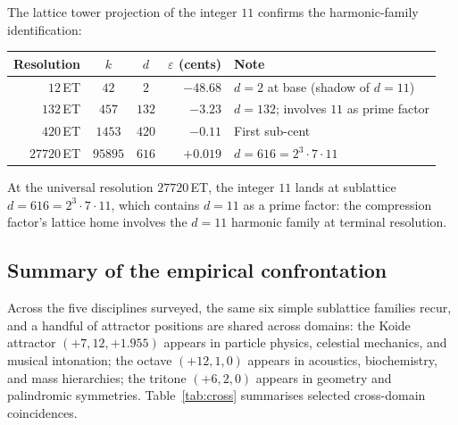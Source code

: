 \documentclass[11pt,a4paper]{article}
\theoremstyle{definition}
\theoremstyle{remark}
\begin{document}
The lattice tower projection of the integer $11$ confirms the harmonic-family identification:
\begin{center}
\begin{tabular}{@{}r c c r l@{}}
\toprule
Resolution & $k$ & $d$ & $\varepsilon$ (cents) & Note\\
\midrule
$12$\,ET & $42$ & $2$ & $-48.68$ & $d=2$ at base (shadow of $d=11$)\\
$132$\,ET & $457$ & $132$ & $-3.23$ & $d=132$; involves $11$ as prime factor\\
$420$\,ET & $1453$ & $420$ & $-0.11$ & First sub-cent\\
$27720$\,ET & $95895$ & $616$ & $+0.019$ & $d = 616 = 2^{3}\!\cdot\!7\!\cdot\!11$\\
\bottomrule
\end{tabular}
\end{center}
At the universal resolution $27720$\,ET, the integer $11$ lands at sublattice $d = 616 = 2^{3}\cdot 7\cdot 11$, which contains $d=11$ as a prime factor: the compression factor's lattice home involves the $d=11$ harmonic family at terminal resolution.

\subsection{Summary of the empirical confrontation}

Across the five disciplines surveyed, the same six simple sublattice families recur, and a handful of attractor positions are shared across domains: the Koide attractor $(+7,12,+1.955)$ appears in particle physics, celestial mechanics, and musical intonation; the octave $(+12,1,0)$ appears in acoustics, biochemistry, and mass hierarchies; the tritone $(+6,2,0)$ appears in geometry and palindromic symmetries. Table~\ref{tab:cross} summarises selected cross-domain coincidences.
\end{document}
